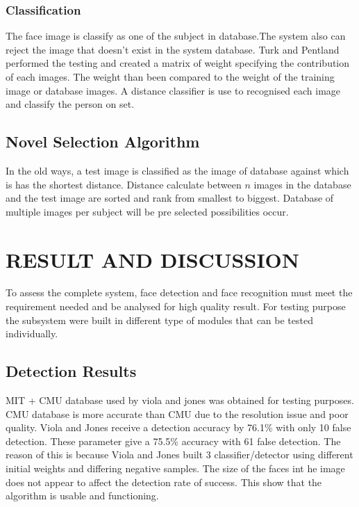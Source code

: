 \documentclass[a4paper,11pt]{article}
\begin{document}
\subsubsection{Classification}
\hspace{1cm}The face image is classify as one of the subject in database.The system also can reject the image that doesn't exist in the system database. Turk and Pentland performed the testing and created a matrix of weight specifying the contribution of each images. The weight than been compared to the weight of the training image or database images. A distance classifier is use to recognised each image and classify the person on set.

\subsection{Novel Selection Algorithm}
\hspace{1cm} In the old ways, a test image is classified as the image of database against which is has the shortest distance. Distance calculate between $n$ images in the database and the test image are sorted and rank from smallest to biggest. Database of multiple images per subject will be pre selected possibilities occur.
\section{RESULT AND DISCUSSION}
\hspace{1cm} To assess the complete system, face detection and face recognition must meet the requirement needed and be analysed for high quality result. For testing purpose the subsystem were built in different type of modules that can be tested individually.

\subsection{Detection Results}
\hspace{1cm} MIT + CMU database used by viola and jones was obtained for testing purposes. CMU database is more accurate than CMU due to the resolution issue and poor quality. Viola and Jones receive a detection accuracy by 76.1\% with only 10 false detection. These parameter give a 75.5\% accuracy with 61 false detection. The reason of this is because Viola and Jones built 3 classifier/detector using different initial weights and differing negative samples. The size of the faces int he image does not appear to affect the detection rate of success. This show that the algorithm is usable and functioning.
\end{document}
